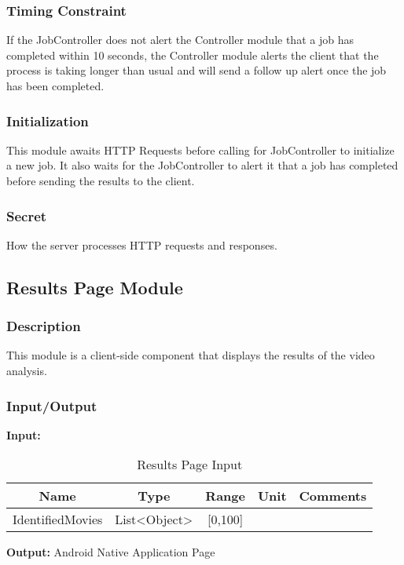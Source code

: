 \documentclass{article}
\begin{document}
\subsubsection{Timing Constraint}
If the JobController does not alert the Controller module that a job has completed within 10 seconds, the Controller module alerts the client that the process is taking longer than usual and will send a follow up alert once the job has been completed.

\subsubsection{Initialization}
This module awaits HTTP Requests before calling for JobController to initialize a new job. It also waits for the JobController to alert it that a job has completed before sending the results to the client.

\subsubsection{Secret}
How the server processes HTTP requests and responses.

\subsection{Results Page Module}
\subsubsection{Description} 
This module is a client-side component that displays the results of the video analysis.

\subsubsection{Input/Output}
\textbf{Input:}
\begin{table}[H]
    \caption{Results Page Input}
    \centering
    \begin{tabularx}{0.7\textwidth}{|c|c|c|c|X|} \hline
        \textbf{Name} & \textbf{Type} & \textbf{Range} & \textbf{Unit} & \textbf{Comments} \\ \hline
        IdentifiedMovies & List<Object> & [0,100] & & \\ \hline
    \end{tabularx}
    \label{tab:Results_Page_Input}
\end{table}

\textbf{Output:} Android Native Application Page
\end{document}
